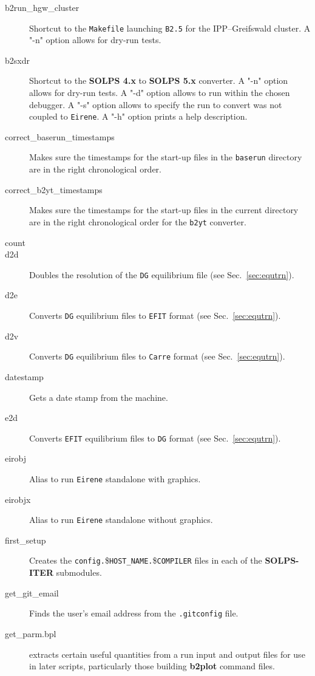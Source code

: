 \documentclass[a4paper,10pt]{report}
\newcommand\SOLPSfour{{\bf SOLPS 4.x} }
\newcommand\SOLPSfive{{\bf SOLPS 5.x} }
\newcommand\SOLPSITER{{\bf SOLPS-ITER} }
\newcommand{\btwoplot}{{\bf b2plot} }
\begin{document}
\begin{itemize}
\begin{description}
  \item[b2run\_hgw\_cluster] Shortcut to the {\tt Makefile} launching {\tt B2.5} for the IPP--Greifswald cluster. A "-n" option allows for dry-run tests.
  \item[b2sxdr] Shortcut to the \SOLPSfour to \SOLPSfive
    converter. A "-n" option allows for dry-run tests. A "-d" option allows to run within the chosen debugger. A "-s" option allows to specify the run to convert was not coupled to {\tt Eirene}. A "-h" option prints a help description.
  \item[correct\_baserun\_timestamps]
    Makes sure the timestamps for the start-up files in the {\tt baserun}
    directory are in the right chronological order.
  \item[correct\_b2yt\_timestamps]
    Makes sure the timestamps for the start-up files in the current
    directory are in the right chronological order for the {\tt b2yt} converter.
  \item[count]
  \item[d2d] Doubles the resolution of the {\tt DG} equilibrium file (see Sec.~\ref{sec:equtrn}).
  \item[d2e] Converts {\tt DG} equilibrium files to {\tt EFIT} format (see Sec.~\ref{sec:equtrn}).
  \item[d2v] Converts {\tt DG} equilibrium files to {\tt Carre} format (see Sec.~\ref{sec:equtrn}).
  \item[datestamp] Gets a date stamp from the machine.
  \item[e2d] Converts {\tt EFIT} equilibrium files to {\tt DG} format (see Sec.~\ref{sec:equtrn}).
  \item[eirobj] Alias to run {\tt Eirene} standalone with graphics.
  \item[eirobjx] Alias to run {\tt Eirene} standalone without graphics.
  \item[first\_setup] Creates the {\tt config.}\${\tt {HOST\_NAME}.}\${\tt {COMPILER}} files in each of the \SOLPSITER submodules.
  \item[get\_git\_email] Finds the user's email address from the {\tt .gitconfig} file.
  \item[get\_parm.bpl] extracts certain useful quantities from a run input and output files for use in later scripts, particularly those building \btwoplot command files.

\end{description}
\end{itemize}
\end{document}
